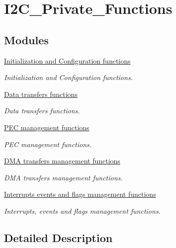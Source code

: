 \hypertarget{group___i2_c___private___functions}{}\section{I2\+C\+\_\+\+Private\+\_\+\+Functions}
\label{group___i2_c___private___functions}
\subsection*{Modules}
\begin{DoxyCompactItemize}
\item 
\hyperlink{group___i2_c___group1}{Initialization and Configuration functions}
\begin{DoxyCompactList}\small\item\em Initialization and Configuration functions. \end{DoxyCompactList}\item 
\hyperlink{group___i2_c___group2}{Data transfers functions}
\begin{DoxyCompactList}\small\item\em Data transfers functions. \end{DoxyCompactList}\item 
\hyperlink{group___i2_c___group3}{P\+E\+C management functions}
\begin{DoxyCompactList}\small\item\em P\+E\+C management functions. \end{DoxyCompactList}\item 
\hyperlink{group___i2_c___group4}{D\+M\+A transfers management functions}
\begin{DoxyCompactList}\small\item\em D\+M\+A transfers management functions. \end{DoxyCompactList}\item 
\hyperlink{group___i2_c___group5}{Interrupts events and flags management functions}
\begin{DoxyCompactList}\small\item\em Interrupts, events and flags management functions. \end{DoxyCompactList}\end{DoxyCompactItemize}


\subsection{Detailed Description}
